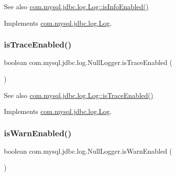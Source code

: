 \begin{DoxySeeAlso}{See also}
\mbox{\hyperlink{interfacecom_1_1mysql_1_1jdbc_1_1log_1_1_log_a8ca112798ee938dfb0fa06ffca504922}{com.\+mysql.\+jdbc.\+log.\+Log\+::is\+Info\+Enabled()}} 
\end{DoxySeeAlso}


Implements \mbox{\hyperlink{interfacecom_1_1mysql_1_1jdbc_1_1log_1_1_log_a8ca112798ee938dfb0fa06ffca504922}{com.\+mysql.\+jdbc.\+log.\+Log}}.

\mbox{\label{classcom_1_1mysql_1_1jdbc_1_1log_1_1_null_logger_af97ff4755fae09351593f88f65298b30}} 
\subsubsection{\texorpdfstring{is\+Trace\+Enabled()}{isTraceEnabled()}}
{\footnotesize\ttfamily boolean com.\+mysql.\+jdbc.\+log.\+Null\+Logger.\+is\+Trace\+Enabled (\begin{DoxyParamCaption}{ }\end{DoxyParamCaption})}

\begin{DoxySeeAlso}{See also}
\mbox{\hyperlink{interfacecom_1_1mysql_1_1jdbc_1_1log_1_1_log_a821407c0c861bbb9de4618617e2fa519}{com.\+mysql.\+jdbc.\+log.\+Log\+::is\+Trace\+Enabled()}} 
\end{DoxySeeAlso}


Implements \mbox{\hyperlink{interfacecom_1_1mysql_1_1jdbc_1_1log_1_1_log_a821407c0c861bbb9de4618617e2fa519}{com.\+mysql.\+jdbc.\+log.\+Log}}.

\mbox{\label{classcom_1_1mysql_1_1jdbc_1_1log_1_1_null_logger_aad72483ac79c28b596fdf1a3d4642b9e}} 
\subsubsection{\texorpdfstring{is\+Warn\+Enabled()}{isWarnEnabled()}}
{\footnotesize\ttfamily boolean com.\+mysql.\+jdbc.\+log.\+Null\+Logger.\+is\+Warn\+Enabled (\begin{DoxyParamCaption}{ }\end{DoxyParamCaption})}

